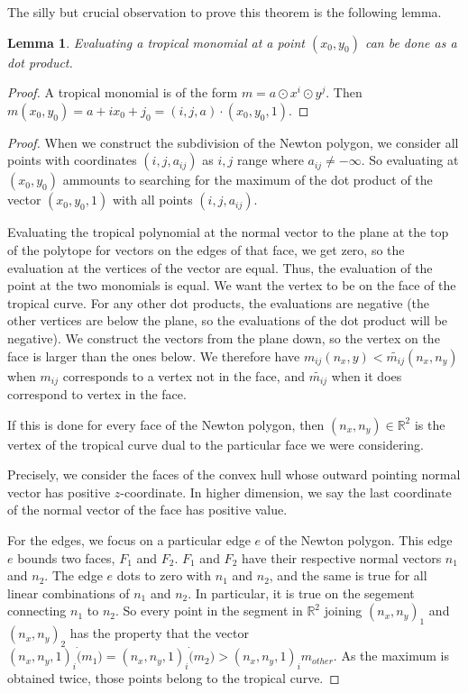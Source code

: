 \documentclass[12pt]{memoir}
\newtheorem{protolemma}[prototheorem]{Lemma}
\newenvironment{lemma}
   {\begin{protolemma}}
   {\end{protolemma}}
\theoremstyle{definition}
\def\RR{{\mathbb R}}
\begin{document}
The silly but crucial observation to prove this theorem is the following lemma.

\begin{lemma}
    Evaluating a tropical monomial at a point $(x_0,y_0)$ can be done as a dot product.
\end{lemma}
\begin{proof}
    A tropical monomial is of the form $m=a\odot x^i \odot y^j$. Then $m(x_0,y_0) = a + ix_0 +j_0 = (i,j,a)\cdot(x_0,y_0,1)$.
\end{proof}


\begin{proof}

When we construct the subdivision of the Newton polygon, we consider all points with coordinates $(i,j,a_{ij})$ as $i,j$ range where $a_{ij} \neq -\infty$. So evaluating at $(x_0,y_0)$ ammounts to searching for the maximum of the dot product of the vector $(x_0,y_0,1)$ with all points $(i,j,a_{ij})$.


Evaluating the tropical polynomial at the normal vector to the plane at the top of the polytope for vectors on the edges of that face, we get zero, so the evaluation at the vertices of the vector are equal. Thus, the evaluation of the point at the two monomials is equal. We want the vertex to be on the face of the tropical curve. For any other dot products, the evaluations are negative (the other vertices are below the plane, so the evaluations of the dot product will be negative). We construct the vectors from the plane down, so the vertex on the face is larger than the ones below. We therefore have $m_{ij}(n_x,y) <\tilde{m_{ij}}(n_x,n_y)$ when $m_{ij}$ corresponds to a vertex not in the face, and $\tilde{m_{ij}}$ when it does correspond to vertex in the face.



If this is done for every face of the Newton polygon, then $(n_x,n_y) \in \RR^2$ is the vertex of the tropical curve dual to the particular face we were considering.




Precisely, we consider the faces of the convex hull whose outward pointing normal vector has positive $z$-coordinate. In higher dimension, we say the last coordinate of the normal vector of the face has positive value.

    
For the edges, we focus on a particular edge $e$ of the Newton polygon. This edge $e$ bounds two faces, $F_1$ and $F_2$. $F_1$ and $F_2$ have their respective normal vectors $n_1$ and $n_2$. The edge $e$ dots to zero with $n_1$ and $n_2$, and the same is true for all linear combinations of $n_1$ and $n_2$. In particular, it is true on the segement connecting $n_1$ to $n_2$. So every point in the segment in $\RR^2$ joining $(n_x,n_y)_1$ and $(n_x,n_y)_2$ has the property that the vector $(n_x,n_y,1)_i \dot (m_1)=(n_x,n_y,1)_i \dot (m_2) > (n_x,n_y,1)_i m_{other}$. As the maximum is obtained twice, those points belong to the tropical curve.

\end{proof}
\end{document}
